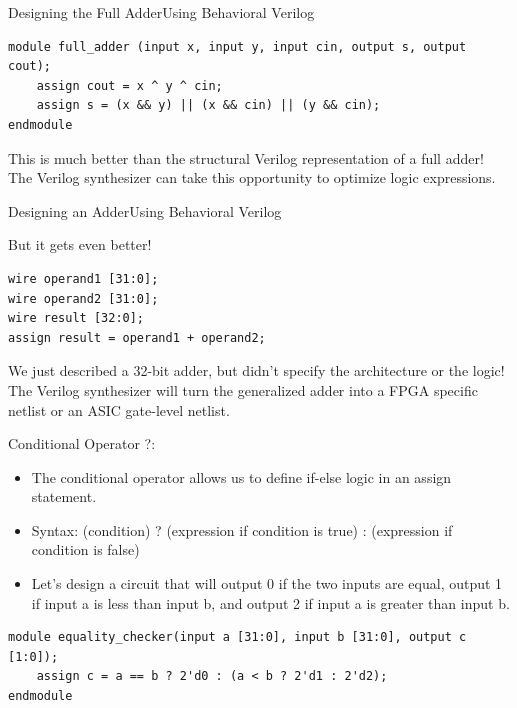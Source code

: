 \documentclass{beamer}
\begin{document}
\begin{frame}[fragile]{Designing the Full Adder}{Using Behavioral Verilog}
\begin{verbatim}
module full_adder (input x, input y, input cin, output s, output cout);
	assign cout = x ^ y ^ cin;
	assign s = (x && y) || (x && cin) || (y && cin);
endmodule
\end{verbatim}
This is much better than the structural Verilog representation of a full adder! The Verilog synthesizer can take this opportunity to optimize logic expressions.
\end{frame}

\begin{frame}[fragile]{Designing an Adder}{Using Behavioral Verilog}

But it gets even better!

\begin{verbatim}
wire operand1 [31:0];
wire operand2 [31:0];
wire result [32:0];
assign result = operand1 + operand2;
\end{verbatim}

We just described a 32-bit adder, but didn't specify the architecture or the logic! The Verilog synthesizer will turn the generalized adder into a FPGA specific netlist or an ASIC gate-level netlist.
\end{frame}

\begin{frame}[fragile]{Conditional Operator ?:}
	\begin{itemize}
		\item The conditional operator allows us to define if-else logic in an assign statement.
		\item Syntax: (condition) ? (expression if condition is true) : (expression if condition is false)
		\item Let's design a circuit that will output 0 if the two inputs are equal, output 1 if input a is less than input b, and output 2 if input a is greater than input b.
	\end{itemize}

\begin{verbatim}
module equality_checker(input a [31:0], input b [31:0], output c [1:0]);
	assign c = a == b ? 2'd0 : (a < b ? 2'd1 : 2'd2);
endmodule
\end{verbatim}
\end{frame}
\end{document}
